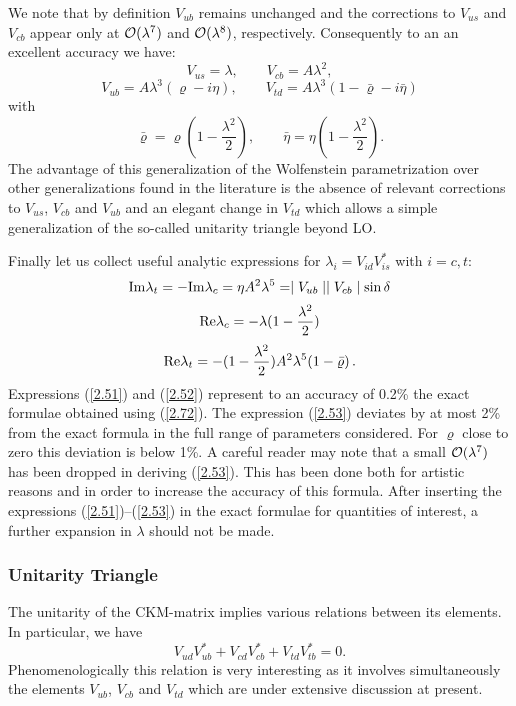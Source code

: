 \documentclass[12pt,rotate]{article}
\newcommand{\RE}{{\rm Re}}
\newcommand{\IM}{{\rm Im}}
\newcommand{\ord}{{\cal O}}
\begin{document}
\begin{itemize}
We note that by definition
$V_{ub}$ remains unchanged and the
corrections to $V_{us}$ and $V_{cb}$ appear only at $\ord(\lambda^7)$ and
$\ord(\lambda^8)$, respectively.
Consequently to an 
 an excellent accuracy we have:
\begin{equation}\label{CKM1}
V_{us}=\lambda, \qquad V_{cb}=A\lambda^2,
\end{equation}
\begin{equation}\label{CKM2}
V_{ub}=A\lambda^3(\varrho-i\eta),
\qquad
V_{td}=A\lambda^3(1-\bar\varrho-i\bar\eta)
\end{equation}
with
\begin{equation}\label{2.88d}
\bar\varrho=\varrho (1-\frac{\lambda^2}{2}),
\qquad
\bar\eta=\eta (1-\frac{\lambda^2}{2}).
\end{equation}
The advantage of this generalization of the Wolfenstein parametrization
over other generalizations found in the literature is the absence of
relevant corrections to $V_{us}$, $V_{cb}$ and $V_{ub}$ and an elegant
change in $V_{td}$ which allows a simple generalization of the 
so-called unitarity triangle beyond LO.

Finally let us collect useful analytic expressions
for $\lambda_i=V_{id}V^*_{is}$ with $i=c,t$:
\begin{equation}\label{2.51}
 \IM\lambda_t= -\IM\lambda_c=\eta A^2\lambda^5=
\mid V_{ub}\mid \mid V_{cb} \mid \sin\delta 
\end{equation}
\begin{equation}\label{2.52}
 \RE\lambda_c=-\lambda (1-\frac{\lambda^2}{2})
\end{equation}
\begin{equation}\label{2.53}
 \RE\lambda_t= -(1-\frac{\lambda^2}{2}) A^2\lambda^5 (1-\bar\varrho) \,.
\end{equation}
Expressions (\ref{2.51}) and (\ref{2.52}) represent to an accuracy of
0.2\% the exact formulae obtained using (\ref{2.72}). The expression
(\ref{2.53}) deviates by at most 2\% from the exact formula in the
full range of parameters considered. For $\varrho$ close to zero
this deviation is below 1\%. A careful reader may note that a small
$\ord(\lambda^7)$ has been dropped in deriving (\ref{2.53}). This
has been done both for artistic reasons and in order to increase
the accuracy of this formula.
After inserting the expressions (\ref{2.51})--(\ref{2.53}) in the exact
formulae for quantities of interest, a further expansion in $\lambda$
should not be made. 
\subsubsection{Unitarity Triangle}
The unitarity of the CKM-matrix implies various relations between its
elements. In particular, we have
\begin{equation}\label{2.87h}
V_{ud}^{}V_{ub}^* + V_{cd}^{}V_{cb}^* + V_{td}^{}V_{tb}^* =0.
\end{equation}
Phenomenologically this relation is very interesting as it involves
simultaneously the elements $V_{ub}$, $V_{cb}$ and $V_{td}$ which are
under extensive discussion at present.


\end{itemize}
\end{document}
